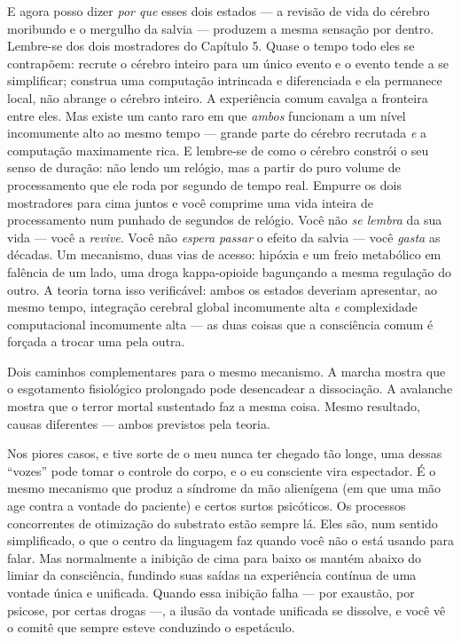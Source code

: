 \documentclass[11pt, twoside, openright]{book}
\begin{document}
E agora posso dizer \textit{por que} esses dois estados --- a revisão de vida do cérebro moribundo e o mergulho da salvia --- produzem a mesma sensação por dentro. Lembre-se dos dois mostradores do Capítulo 5. Quase o tempo todo eles se contrapõem: recrute o cérebro inteiro para um único evento e o evento tende a se simplificar; construa uma computação intrincada e diferenciada e ela permanece local, não abrange o cérebro inteiro. A experiência comum cavalga a fronteira entre eles. Mas existe um canto raro em que \textit{ambos} funcionam a um nível incomumente alto ao mesmo tempo --- grande parte do cérebro recrutada \textit{e} a computação maximamente rica. E lembre-se de como o cérebro constrói o seu senso de duração: não lendo um relógio, mas a partir do puro volume de processamento que ele roda por segundo de tempo real. Empurre os dois mostradores para cima juntos e você comprime uma vida inteira de processamento num punhado de segundos de relógio. Você não \textit{se lembra} da sua vida --- você a \textit{revive}. Você não \textit{espera passar} o efeito da salvia --- você \textit{gasta} as décadas. Um mecanismo, duas vias de acesso: hipóxia e um freio metabólico em falência de um lado, uma droga kappa-opioide bagunçando a mesma regulação do outro. A teoria torna isso verificável: ambos os estados deveriam apresentar, ao mesmo tempo, integração cerebral global incomumente alta \textit{e} complexidade computacional incomumente alta --- as duas coisas que a consciência comum é forçada a trocar uma pela outra.

Dois caminhos complementares para o mesmo mecanismo. A marcha mostra que o esgotamento fisiológico prolongado pode desencadear a dissociação. A avalanche mostra que o terror mortal sustentado faz a mesma coisa. Mesmo resultado, causas diferentes --- ambos previstos pela teoria.

Nos piores casos, e tive sorte de o meu nunca ter chegado tão longe, uma dessas ``vozes'' pode tomar o controle do corpo, e o eu consciente vira espectador. É o mesmo mecanismo que produz a síndrome da mão alienígena (em que uma mão age contra a vontade do paciente) e certos surtos psicóticos. Os processos concorrentes de otimização do substrato estão sempre lá. Eles são, num sentido simplificado, o que o centro da linguagem faz quando você não o está usando para falar. Mas normalmente a inibição de cima para baixo os mantém abaixo do limiar da consciência, fundindo suas saídas na experiência contínua de uma vontade única e unificada. Quando essa inibição falha --- por exaustão, por psicose, por certas drogas ---, a ilusão da vontade unificada se dissolve, e você vê o comitê que sempre esteve conduzindo o espetáculo.
\end{document}
